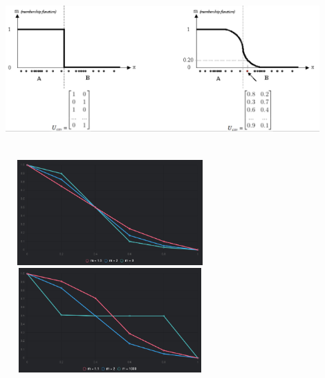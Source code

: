 \documentclass[10pt]{beamer}
\begin{document}
\begin{frame}{}
	\includegraphics[height=6cm, width=12cm]{fuzzy_vs_kmeans}
\end{frame}

\begin{frame}{}
	\begin{center}
	\includegraphics[height=4cm, width=8cm]{fuzzifier_1}\\
	\includegraphics[height=4cm, width=8cm]{fuzzifier_2}
	\end{center}
\end{frame}
\end{document}
